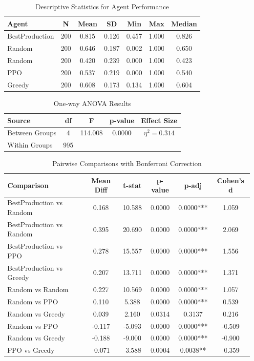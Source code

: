 \begin{table}[H]
\centering
\caption{Descriptive Statistics for Agent Performance}
\label{tab:descriptive_stats}
\begin{tabular}{lcccccc}
\toprule
Agent & N & Mean & SD & Min & Max & Median \\
\midrule
BestProduction & 200 & 0.815 & 0.126 & 0.457 & 1.000 & 0.826 \\
Random & 200 & 0.646 & 0.187 & 0.002 & 1.000 & 0.650 \\
Random & 200 & 0.420 & 0.239 & 0.000 & 1.000 & 0.423 \\
PPO & 200 & 0.537 & 0.219 & 0.000 & 1.000 & 0.540 \\
Greedy & 200 & 0.608 & 0.173 & 0.134 & 1.000 & 0.604 \\
\bottomrule
\end{tabular}
\end{table}

\begin{table}[H]
\centering
\caption{One-way ANOVA Results}
\label{tab:anova_results}
\begin{tabular}{lcccc}
\toprule
Source & df & F & p-value & Effect Size \\
\midrule
Between Groups & 4 & 114.008 & 0.0000 & $\eta^2 = 0.314$ \\
Within Groups & 995 &  &  &  \\
\bottomrule
\end{tabular}
\end{table}

\begin{table}[H]
\centering
\caption{Pairwise Comparisons with Bonferroni Correction}
\label{tab:pairwise_comparisons}
\begin{tabular}{lccccc}
\toprule
Comparison & Mean Diff & t-stat & p-value & p-adj & Cohen's d \\
\midrule
BestProduction vs Random & 0.168 & 10.588 & 0.0000 & 0.0000*** & 1.059 \\
BestProduction vs Random & 0.395 & 20.690 & 0.0000 & 0.0000*** & 2.069 \\
BestProduction vs PPO & 0.278 & 15.557 & 0.0000 & 0.0000*** & 1.556 \\
BestProduction vs Greedy & 0.207 & 13.711 & 0.0000 & 0.0000*** & 1.371 \\
Random vs Random & 0.227 & 10.569 & 0.0000 & 0.0000*** & 1.057 \\
Random vs PPO & 0.110 & 5.388 & 0.0000 & 0.0000*** & 0.539 \\
Random vs Greedy & 0.039 & 2.160 & 0.0314 & 0.3137 & 0.216 \\
Random vs PPO & -0.117 & -5.093 & 0.0000 & 0.0000*** & -0.509 \\
Random vs Greedy & -0.188 & -9.000 & 0.0000 & 0.0000*** & -0.900 \\
PPO vs Greedy & -0.071 & -3.588 & 0.0004 & 0.0038** & -0.359 \\
\bottomrule
\end{tabular}
\end{table}